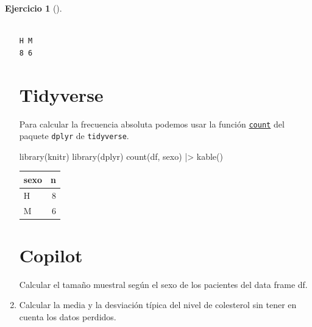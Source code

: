 \documentclass[
  a4paper,
]{scrreport}
\newenvironment{Shaded}{\begin{snugshade}}{\end{snugshade}}
\newcommand{\ExtensionTok}[1]{\textcolor[rgb]{0.00,0.23,0.31}{#1}}
\newcommand{\FunctionTok}[1]{\textcolor[rgb]{0.28,0.35,0.67}{#1}}
\newcommand{\NormalTok}[1]{\textcolor[rgb]{0.00,0.23,0.31}{#1}}
\newcommand{\SpecialCharTok}[1]{\textcolor[rgb]{0.37,0.37,0.37}{#1}}
\theoremstyle{definition}
\newtheorem{exercise}{Ejercicio}[chapter]
\theoremstyle{remark}
\begin{document}
\begin{exercise}[]
\begin{enumerate}
\begin{tcolorbox}
\begin{verbatim}

H M 
8 6 
\end{verbatim}

  \section{Tidyverse}

  Para calcular la frecuencia absoluta podemos usar la función
  \href{https://aprendeconalf.es/manual-r/06-preprocesamiento.html\#conteo-del-n\%C3\%BAmero-de-observaciones}{\texttt{count}}
  del paquete \texttt{dplyr} de \texttt{tidyverse}.

\begin{Shaded}
\begin{Highlighting}[]
\FunctionTok{library}\NormalTok{(knitr)}
\FunctionTok{library}\NormalTok{(dplyr)}
\FunctionTok{count}\NormalTok{(df, sexo) }\SpecialCharTok{|\textgreater{}} \FunctionTok{kable}\NormalTok{()}
\end{Highlighting}
\end{Shaded}

  \begin{longtable}[]{@{}lr@{}}
  \toprule\noalign{}
  sexo & n \\
  \midrule\noalign{}
  \endhead
  \bottomrule\noalign{}
  \endlastfoot
  H & 8 \\
  M & 6 \\
  \end{longtable}

  \section{Copilot}

\begin{Shaded}
\begin{Highlighting}[]
\ExtensionTok{Calcular}\NormalTok{ el tamaño muestral según el sexo de los pacientes del data frame df.}
\end{Highlighting}
\end{Shaded}

  \end{tcolorbox}
\item
  Calcular la media y la desviación típica del nivel de colesterol sin
  tener en cuenta los datos perdidos.

  \begin{tcolorbox}[enhanced jigsaw, colframe=quarto-callout-tip-color-frame, toprule=.15mm, bottomtitle=1mm, breakable, opacitybacktitle=0.6, toptitle=1mm, colback=white, bottomrule=.15mm, title=\textcolor{quarto-callout-tip-color}{\faLightbulb}\hspace{0.5em}{Solución}, arc=.35mm, left=2mm, titlerule=0mm, rightrule=.15mm, coltitle=black, leftrule=.75mm, opacityback=0, colbacktitle=quarto-callout-tip-color!10!white]


\end{tcolorbox}
\end{enumerate}
\end{exercise}
\end{document}
